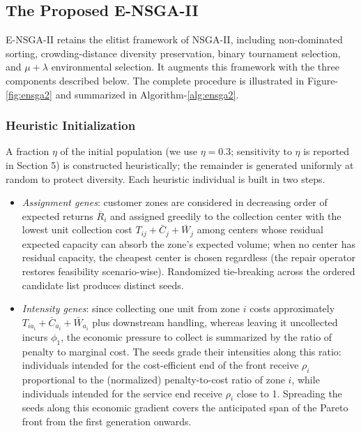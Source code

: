 \documentclass[11pt, a4paper]{article}
\begin{document}
\subsection{The Proposed E-NSGA-II}
E-NSGA-II retains the elitist framework of NSGA-II, including non-dominated sorting, crowding-distance diversity preservation, binary tournament selection, and $\mu + \lambda$ environmental selection. It augments this framework with the three components described below. The complete procedure is illustrated in Figure-\ref{fig:ensga2} and summarized in Algorithm-\ref{alg:ensga2}.
\subsubsection{{Heuristic Initialization}}
A fraction $\eta$ of the initial population (we use $\eta = 0.3$; sensitivity to $\eta$ is reported in Section 5) is constructed heuristically; the remainder is generated uniformly at random to protect diversity. Each heuristic individual is built in two steps.
\begin{itemize}
    \item \emph{Assignment genes}: customer zones are considered in decreasing
order of expected returns $\bar{R}_i$ and assigned greedily to the collection center with the lowest unit collection cost $T_{ij} + \bar{C}_j + \bar{W}_j$ among centers whose residual expected capacity can absorb the zone's expected volume; when no center has residual capacity, the cheapest center is chosen regardless (the repair operator restores feasibility scenario-wise). Randomized tie-breaking across the ordered candidate list produces distinct seeds.
\item \emph{Intensity genes}: since collecting one unit from zone $i$ costs approximately $T_{i a_i} + \bar{C}_{a_i} + \bar{W}_{a_i}$ plus downstream handling, whereas leaving it uncollected incurs $\phi_1$, the economic pressure to collect is summarized by the ratio of penalty to marginal cost. The seeds grade their intensities along this ratio: individuals intended for the cost-efficient end of the front receive $\rho_i$ proportional to the (normalized) penalty-to-cost ratio of zone $i$, while individuals intended for the service end receive $\rho_i$ close to 1. Spreading the seeds along this economic gradient covers the anticipated span of the Pareto front from the first generation onwards.
\end{itemize}
\end{document}
